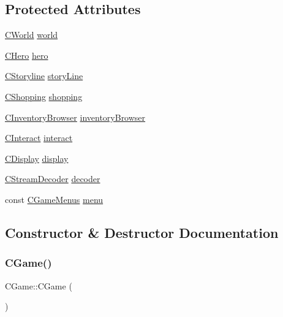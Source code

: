 \subsection*{Protected Attributes}
\begin{DoxyCompactItemize}
\item 
\mbox{\hyperlink{class_c_world}{C\+World}} \mbox{\hyperlink{class_c_game_a034dfd3cfdbc751db8c8dca996b95b2f}{world}}
\item 
\mbox{\hyperlink{class_c_hero}{C\+Hero}} \mbox{\hyperlink{class_c_game_a7e31b4990fbeed0807687ac79090d74d}{hero}}
\item 
\mbox{\hyperlink{class_c_storyline}{C\+Storyline}} \mbox{\hyperlink{class_c_game_af02e0478a8e6902d8f14402c217df461}{story\+Line}}
\item 
\mbox{\hyperlink{class_c_shopping}{C\+Shopping}} \mbox{\hyperlink{class_c_game_a0fdb3b2f7ef2565b0d52fdb987491f90}{shopping}}
\item 
\mbox{\hyperlink{class_c_inventory_browser}{C\+Inventory\+Browser}} \mbox{\hyperlink{class_c_game_ad50675d39a64418fae09cb6aec75acb9}{inventory\+Browser}}
\item 
\mbox{\hyperlink{class_c_interact}{C\+Interact}} \mbox{\hyperlink{class_c_game_a5ba16b5e2d1247df3a4c1e0f2c29dbb2}{interact}}
\item 
\mbox{\hyperlink{class_c_display}{C\+Display}} \mbox{\hyperlink{class_c_game_abe46d7461659b658b17f556b311eb4bb}{display}}
\item 
\mbox{\hyperlink{class_c_stream_decoder}{C\+Stream\+Decoder}} \mbox{\hyperlink{class_c_game_aea418660907ae3c1940cc2a664f679f3}{decoder}}
\item 
const \mbox{\hyperlink{class_c_game_menus}{C\+Game\+Menus}} \mbox{\hyperlink{class_c_game_ae4fce376120af544df73c0d264103502}{menu}}
\end{DoxyCompactItemize}


\subsection{Constructor \& Destructor Documentation}
\mbox{\label{class_c_game_a3b905a36ecee2a2da44efb2024812442}} 
\subsubsection{\texorpdfstring{C\+Game()}{CGame()}\hspace{0.1cm}{\footnotesize\ttfamily [1/2]}}
{\footnotesize\ttfamily C\+Game\+::\+C\+Game (\begin{DoxyParamCaption}{ }\end{DoxyParamCaption})\hspace{0.3cm}{\ttfamily [delete]}}

